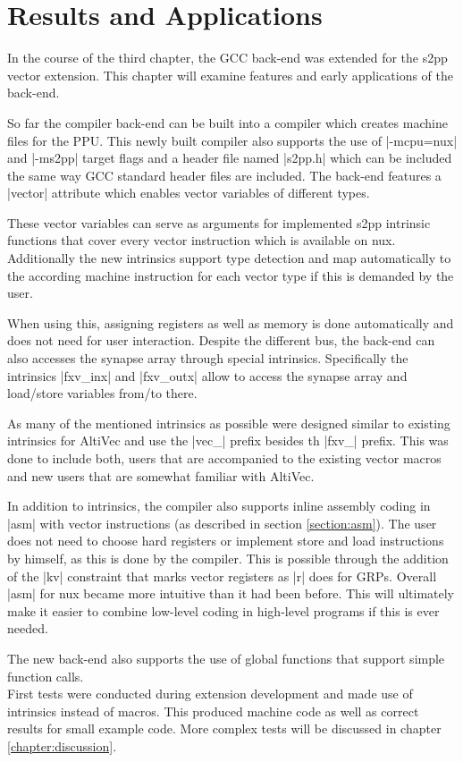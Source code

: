 \chapter{Results and Applications}
\label{chapter:results}
In the course of the third chapter, the GCC back-end was extended for the s2pp vector extension.
This chapter will examine features and early applications of the back-end.

So far the compiler back-end can be built into a compiler which creates machine files for the PPU.
This newly built compiler also supports the use of |-mcpu=nux| and |-ms2pp| target flags and a header file named |s2pp.h| which can be included the same way GCC standard header files are included.
The back-end features a |vector| attribute which enables vector variables of different types.

These vector variables can serve as arguments for implemented s2pp intrinsic functions that cover every vector instruction which is available on nux.
Additionally the new intrinsics support type detection and map automatically to the according machine instruction for each vector type if this is demanded by the user.

When using this, assigning registers as well as memory is done automatically and does not need for user interaction.
Despite the different bus, the back-end can also accesses the synapse array through special intrinsics.
Specifically the intrinsics |fxv_inx| and |fxv_outx| allow to access the synapse array and load/store variables from/to there.

As many of the mentioned intrinsics as possible were designed similar to existing intrinsics for AltiVec and use the |vec_| prefix besides th |fxv_| prefix.
This was done to include both, users that are accompanied to the existing vector macros and new users that are somewhat familiar with AltiVec.

In addition to intrinsics, the compiler also supports inline assembly coding in |asm| with vector instructions (as described in section \ref{section:asm}).
The user does not need to choose hard registers or implement store and load instructions by himself, as this is done by the compiler.
This is possible through the addition of the |kv| constraint that marks vector registers as |r| does for GRPs.
Overall |asm| for nux became more intuitive than it had been before.
This will ultimately make it easier to combine low-level coding in high-level programs if this is ever needed.

The new back-end also supports the use of global functions that support simple function calls.
\\
First tests were conducted during extension development and made use of intrinsics instead of macros.
This produced machine code as well as correct results for small example code.
More complex tests will be discussed in chapter \ref{chapter:discussion}.

